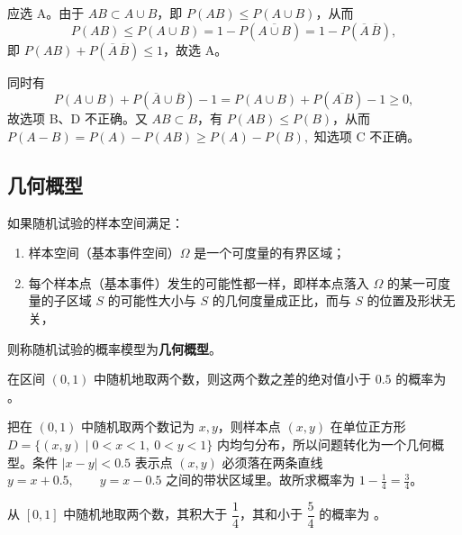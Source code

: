 \documentclass[lang=cn,11pt]{elegantbook}
\begin{document}
\begin{solution}
应选 A。由于 \(AB \subset A \cup B\)，即 \(P(AB) \le P(A \cup B)\)，从而
\[
P(AB) \le P(A \cup B) = 1 - P(\overline{A \cup B}) = 1 - P(\overline{A}\,\overline{B}),
\]
即 \(P(AB) + P(\overline{A}\,\overline{B}) \le 1\)，故选 A。

同时有
\[
P(A \cup B) + P(\overline{A} \cup \overline{B}) - 1 = P(A \cup B) + P(\overline{A\,B}) - 1 \ge 0,
\]
故选项 B、D 不正确。又 \(AB \subset B\)，有 \(P(AB) \le P(B)\)，从而
\(
P(A-B) = P(A) - P(AB) \ge P(A) - P(B),
\)
知选项 C 不正确。
\end{solution}

\subsection{几何概型}

\begin{definition}[几何概型] \label{def:geometric-prob}
如果随机试验的样本空间满足：
\begin{enumerate}
    \item 样本空间（基本事件空间）\(\Omega\) 是一个可度量的有界区域；
    \item 每个样本点（基本事件）发生的可能性都一样，即样本点落入 \(\Omega\) 的某一可度量的子区域 \(S\) 的可能性大小与 \(S\) 的几何度量成正比，而与 \(S\) 的位置及形状无关，
\end{enumerate}
则称随机试验的概率模型为\textbf{几何概型}。
\end{definition}

\begin{exercise}\label{exer:1-7}
在区间 \((0,1)\) 中随机地取两个数，则这两个数之差的绝对值小于 \(0.5\) 的概率为 \underline{\hspace{2cm}}。
\end{exercise}

\begin{solution}
把在 \((0,1)\) 中随机取两个数记为 \(x,y\)，则样本点 \((x,y)\) 在单位正方形
\(
D=\{(x,y)\mid 0<x<1,\ 0<y<1\}
\)
内均匀分布，所以问题转化为一个几何概型。条件 \(|x-y|<0.5\) 表示点 \((x,y)\) 必须落在两条直线
\(
y=x+0.5,\qquad y=x-0.5
\)
之间的带状区域里。故所求概率为 \(1-\frac14=\frac34\)。
\end{solution}

\begin{exercise}\label{exer:1-37}
从 \([0,1]\) 中随机地取两个数，其积大于 \(\dfrac{1}{4}\)，其和小于 \(\dfrac{5}{4}\) 的概率为 \underline{\hspace{2cm}}。
\end{exercise}
\end{document}
